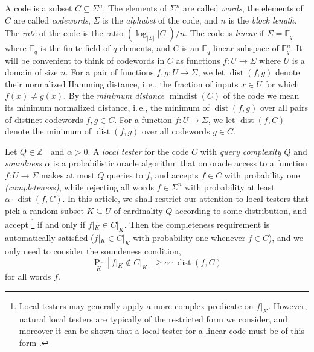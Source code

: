 \documentclass[11pt]{article}
\numberwithin{equation}{section}
\theoremstyle{definition}
\theoremstyle{plain}
\newcommand{\Z}{\mathbb Z}
\newcommand{\ie}{i.\,e.}
\theoremstyle{plain}
\DeclareMathOperator{\dist}{dist} %
\DeclareMathOperator{\mindist}{mindist}  %
\newcommand{\F}{{\mathbb{F}}}
\begin{document}
A code is a subset $C \subseteq \Sigma^n$. The elements of
%
%
%
$\Sigma^n$ are called \emph{words}, the elements of %
$C$ are called \emph{codewords}, $\Sigma$ is the \emph{alphabet} of the code, and $n$ is the \emph{block length}. The \emph{rate} of the code is the ratio $(\log_{|\Sigma|}|C|) / n$. The code is \emph{linear} if $\Sigma = \F_q$ where $\F_q$ is the finite field of $q$ elements, and $C$ is an $\F_q$-linear subspace of $\F_q^n$.
It will be convenient to think of codewords in $C$ as functions $f: U \to \Sigma$ where $U$ is a domain of size $n$.
For a pair of functions $f,g: U \to \Sigma$, we let $\dist(f,g)$ denote
%
their normalized Hamming distance, \ie,  %
the fraction of inputs  $x \in U$ for which $f(x) \ne g(x)$.
%
%
By the \emph{minimum distance}  %
$\mindist(C)$ of the code  %
we mean its minimum normalized distance, \ie,  %
%
the minimum of $\dist(f,g)$ over all
pairs of %
distinct codewords $f,g \in C$.
For a function $f: U \to \Sigma$, we let  $\dist(f,C)$ denote
the minimum of $\dist(f,g)$ over all codewords $g \in C$.

%
%
%
Let $Q\in\Z^+$ and $\alpha > 0$.   %
A \emph{local tester} for the code $C$
with \emph{query complexity $Q$} and \emph{soundness $\alpha$}  %
is a probabilistic oracle algorithm that
on oracle access to a function $f:U \to \Sigma$
makes at most $Q$ queries to $f$, and accepts $f \in C$
with probability one
\emph{(completeness)}, %
%
%
while rejecting %
%
all words $f\in\Sigma^n$  %
with
probability at least $\alpha \cdot \dist(f,C)$.
%
%
In this %
article,  %
we shall restrict our attention to local testers that pick a random subset 
 $K \subseteq U$ of cardinality $Q$ according to some distribution, and 
accept%
%
\footnote{Local testers may generally apply a more complex predicate on $f|_K$. However, natural local testers are typically of the restricted form we consider, and moreover it can be shown that a local tester for a linear code
must be of this form \cite{BenSassonHR2005}.}
if and only if $f|_K \in C|_K$.   %
%
%
%
%
%
Then the completeness requirement is automatically satisfied
($f|_K \in C|_K$ with probability one whenever $f \in C$),
and we only need to consider the soundeness condition,   %
\begin{equation}\label{eq:test}
\Pr_{K}[f|_K \notin C|_K ] \geq \alpha \cdot \dist(f,C)
\end{equation}
%
for all words $f$.  %
\end{document}
